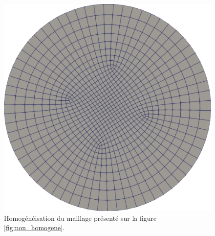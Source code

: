 \begin{figure}[h!]
\centering
\includegraphics[scale=0.34]{images/homogeneiser.pdf}
\caption{Homogénéisation du maillage présenté sur la figure \ref{fig:non_homogene}.}
\label{fig:homogene}
\end{figure}

